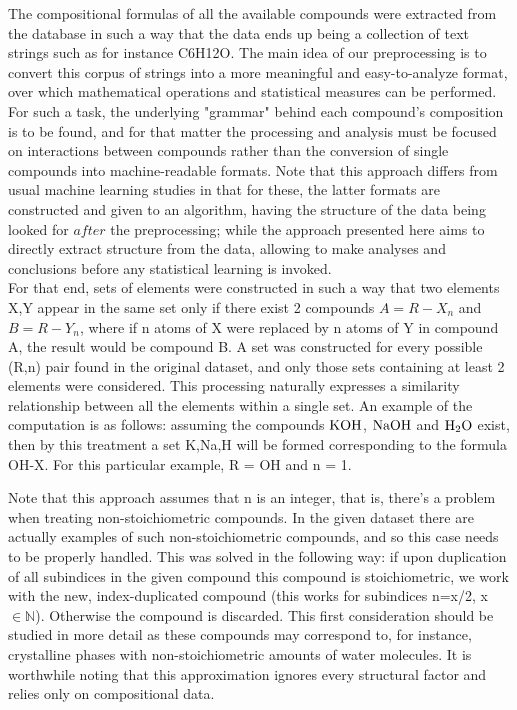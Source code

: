 \documentclass[]{article}
\begin{document}
The compositional formulas of all the available compounds were extracted from the database in such a way that the data ends up being a collection of text strings such as for instance C6H12O. The main idea of our preprocessing is to convert this corpus of strings into a more meaningful and easy-to-analyze format, over which mathematical operations and statistical measures can be performed. For such a task, the underlying "grammar" behind each compound's composition is to be found, and for that matter the processing and analysis must be focused on interactions between compounds rather than the conversion of single compounds into machine-readable formats. Note that this approach differs from usual machine learning studies in that for these, the latter formats are constructed and given to an algorithm, having the structure of the data being looked for $\textit{after}$ the preprocessing; while the  approach presented here aims to directly extract structure from the data, allowing to make analyses and conclusions before any statistical learning is invoked.\\

For that end, sets of elements were constructed in such a way that two elements X,Y appear in the same set only if there exist 2 compounds $A = R-X_n$ and $B = R-Y_n$, where if n atoms of X were replaced by n atoms of Y in compound A, the result would be compound B. A set was constructed for every possible (R,n) pair found in the original dataset, and only those sets containing at least 2 elements were considered. This processing naturally expresses a similarity relationship between all the elements within a single set. An example of the computation is as follows: assuming the compounds $\ce{KOH}$, $\ce{NaOH}$ and $\ce{H2O}$ exist, then by this treatment a set {K,Na,H} will be formed corresponding to the formula OH-X. For this particular example, R = OH and n = 1.

Note that this approach assumes that n is an integer, that is, there's a problem when treating non-stoichiometric compounds. In the given dataset there are actually examples of such non-stoichiometric compounds, and so this case needs to be properly handled. This was solved in the following way: if upon duplication of all subindices in the given compound this compound is stoichiometric, we work with the new, index-duplicated compound (this works for subindices n=x/2, x $\in \mathbb{N}$). Otherwise the compound is discarded. This first consideration should be studied in more detail as these compounds may correspond to, for instance, crystalline phases with non-stoichiometric amounts of water molecules.
It is worthwhile noting that this approximation ignores every structural factor and relies only on compositional data.
\end{document}
